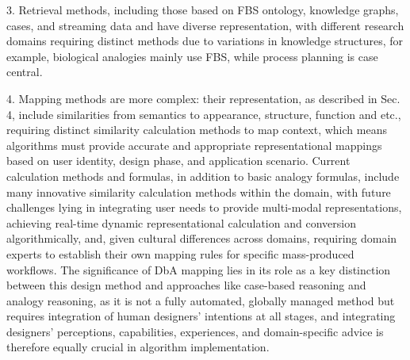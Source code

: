 3. Retrieval methods, including those based on FBS ontology\cite{chen2024toward}, knowledge graphs\cite{huang2024field}, cases\cite{lupiani2017monitoring}, and streaming data\cite{gonzalez2018energy} and have diverse representation, with different research domains requiring distinct methods due to variations in knowledge structures, for example, biological analogies mainly use FBS\cite{chen2024BIDTrain, chen2024toward}, while process planning is case central\cite{zhang2020deep}. 

4. Mapping methods are more complex: their representation, as described in Sec. 4, include similarities from semantics to appearance, structure, function and etc., requiring distinct similarity calculation methods to map context, which means algorithms must provide accurate and appropriate representational mappings based on user identity, design phase, and application scenario. Current calculation methods and formulas, in addition to basic analogy formulas, include many innovative similarity calculation methods within the domain\cite{dimassi2023knowledge, hill2019learning, boteanu2015solving, marquer2024solving}, with future challenges lying in integrating user needs to provide multi-modal representations, achieving real-time dynamic representational calculation and conversion algorithmically, and, given cultural differences across domains, requiring domain experts to establish their own mapping rules for specific mass-produced workflows\cite{cao2025medai, dimassi2023knowledge}. The significance of DbA mapping lies in its role as a key distinction between this design method and approaches like case-based reasoning and analogy reasoning, as it is not a fully automated, globally managed method but requires integration of human designers' intentions at all stages, and integrating designers' perceptions, capabilities, experiences, and domain-specific advice is therefore equally crucial in algorithm implementation.

